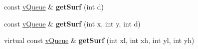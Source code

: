 \begin{DoxyCompactItemize}
\item 
const \hyperlink{classev_1_1vQueue}{v\+Queue} \& {\bfseries get\+Surf} (int d)\hypertarget{classev_1_1vSurface_a16704556a7d824ab59b6250caa4d3c0b}{}\label{classev_1_1vSurface_a16704556a7d824ab59b6250caa4d3c0b}

\item 
const \hyperlink{classev_1_1vQueue}{v\+Queue} \& {\bfseries get\+Surf} (int x, int y, int d)\hypertarget{classev_1_1vSurface_aef72b92ba02f7e6a3e804a995cdf7894}{}\label{classev_1_1vSurface_aef72b92ba02f7e6a3e804a995cdf7894}

\item 
virtual const \hyperlink{classev_1_1vQueue}{v\+Queue} \& {\bfseries get\+Surf} (int xl, int xh, int yl, int yh)\hypertarget{classev_1_1vSurface_ad0364e9a0811fbbe46784c993b5fef31}{}\label{classev_1_1vSurface_ad0364e9a0811fbbe46784c993b5fef31}

\end{DoxyCompactItemize}
